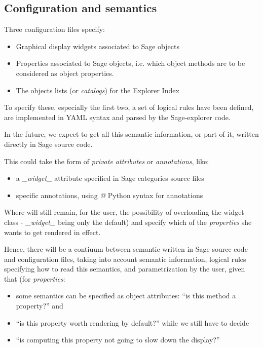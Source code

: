 \documentclass{deliverablereport}
\begin{document}
\subsection{Configuration and semantics}
\label{semantics}

Three configuration files specify:

\begin{itemize}
\item Graphical display widgets associated to Sage objects
  \item Properties associated to Sage objects, i.e. which object methods are
    to be considered as object properties.
\item The objects lists (or \emph{catalogs}) for the Explorer Index
\end{itemize}

To specify these, especially the first two, a set of logical rules
have been defined, are implemented in YAML syntax and parsed by the
Sage-explorer code.

In the future, we expect to get all this semantic information, or part of it,
written directly in Sage source code.

This could take the form of \emph{private attributes} or \emph{annotations}, like:

\begin{itemize}
\item a \emph{\_widget\_} attribute specified in Sage categories source files
\item specific annotations, using \emph{@} Python syntax for annotations
  \end{itemize}

Where will still remain, for the user, the possibility of overloading
the widget class - \emph{\_widget\_} being only the default) and
specify which of the \emph{properties} she wants to get rendered in effect.

Hence, there will be a contiuum between semantic written in Sage
source code and configuration files, taking into account semantic
information, logical rules specifying how to read this semantics, and
parametrization by the user, given that (for \emph{properties}:

\begin{itemize}
\item some semantics can be specified as object attributes: ``is this method a
  property?'' and
  \item ``is this property worth rendering by default?''  while we
    still have to decide
  \item ``is computing this property not going to slow down the display?''
\end{itemize}
\end{document}
